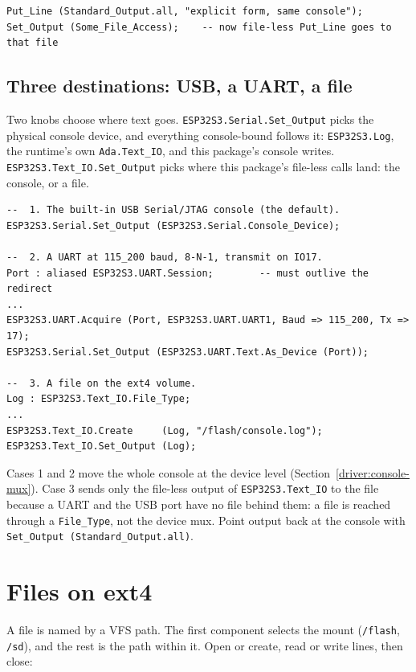\begin{lstlisting}
Put_Line (Standard_Output.all, "explicit form, same console");
Set_Output (Some_File_Access);    -- now file-less Put_Line goes to that file
\end{lstlisting}

\subsection{Three destinations: USB, a UART, a file}

Two knobs choose where text goes. \texttt{ESP32S3.Serial.Set\_Output} picks the
physical console device, and everything console-bound follows it:
\texttt{ESP32S3.Log}, the runtime's own \texttt{Ada.Text\_IO}, and this package's
console writes. \texttt{ESP32S3.Text\_IO.Set\_Output} picks where this package's
file-less calls land: the console, or a file.

\begin{lstlisting}
--  1. The built-in USB Serial/JTAG console (the default).
ESP32S3.Serial.Set_Output (ESP32S3.Serial.Console_Device);

--  2. A UART at 115_200 baud, 8-N-1, transmit on IO17.
Port : aliased ESP32S3.UART.Session;        -- must outlive the redirect
...
ESP32S3.UART.Acquire (Port, ESP32S3.UART.UART1, Baud => 115_200, Tx => 17);
ESP32S3.Serial.Set_Output (ESP32S3.UART.Text.As_Device (Port));

--  3. A file on the ext4 volume.
Log : ESP32S3.Text_IO.File_Type;
...
ESP32S3.Text_IO.Create     (Log, "/flash/console.log");
ESP32S3.Text_IO.Set_Output (Log);
\end{lstlisting}

Cases 1 and 2 move the whole console at the device level
(Section~\ref{driver:console-mux}). Case 3 sends only the file-less output of
\texttt{ESP32S3.Text\_IO} to the file because a UART and the USB port have no
file behind them: a file is reached through a \texttt{File\_Type}, not the device
mux. Point output back at the console with \texttt{Set\_Output (Standard\_Output.all)}.

\section{Files on ext4}

A file is named by a VFS path. The first component selects the mount
(\texttt{/flash}, \texttt{/sd}), and the rest is the path within it. Open or
create, read or write lines, then close:

